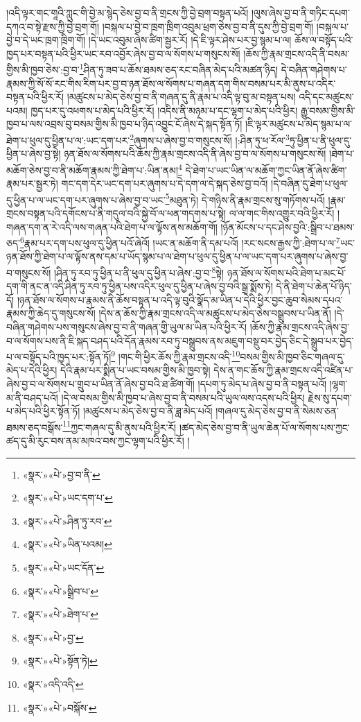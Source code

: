 །འདི་ལྟར་གང་གཱའི་ཀླུང་གི་བྱེ་མ་སྙེད་ཅེས་བྱ་བ་ནི་གྲངས་ཀྱི་བྱེ་བྲག་བསྟན་པའོ། །ལུས་ཞེས་བྱ་བ་ནི་གཏིང་དཔག་དཀའ་བ་སྟེ་རྫས་ཀྱི་བྱེ་བྲག་གོ། །བསྐལ་པ་བྱེ་བ་ཁྲག་ཁྲིག་འབུམ་ཕྲག་ཅེས་བྱ་བ་ནི་དུས་ཀྱི་བྱེ་བྲག་གོ། །བསྐལ་པ་བྱེ་བ་དེ་ཡང་ཁྲག་ཁྲིག་གོ། །དེ་ཡང་འབུམ་ཞེས་ཚིག་སྦྱར་རོ། །དེ་ཇི་ལྟར་ཤེས་པར་བྱ་སྙམ་པ་ལ། ཆོས་ལ་བསྟོད་པའི་ཁྱད་པར་བསྟན་པའི་ཕྱིར་ཡང་རབ་འབྱོར་ཞེས་བྱ་བ་ལ་སོགས་པ་གསུངས་སོ། །ཆོས་ཀྱི་རྣམ་གྲངས་འདི་ནི་བསམ་གྱིས་མི་ཁྱབ་ཅེས་:བྱ་བ་\footnote{«སྣར་»«པེ་»བྱ་བ་ནི་}ཤིན་ཏུ་ཟབ་པ་ཆོས་ཐམས་ཅད་རང་བཞིན་མེད་པའི་མཚན་ཉིད། དེ་བཞིན་གཤེགས་པ་རྣམས་ཀྱི་སོ་སོ་རང་གིས་རིག་པར་བྱ་བ་ཉན་ཐོས་ལ་སོགས་པ་གཞན་དག་གིས་བསམ་པར་མི་ནུས་པ་འདིར་བསྟན་པའི་ཕྱིར་རོ། །མཚུངས་པ་མེད་ཅེས་བྱ་བ་ནི་གཞན་དུ་ནི་རྣམ་པ་འདི་ལྟ་བུ་མ་བསྟན་པས། འདི་དང་མཚུངས་པའམ། ཁྱད་པར་དུ་འཕགས་པ་མེད་པའི་ཕྱིར་རོ། །འདིས་ནི་མཉམ་པ་དང་ལྷག་པ་མེད་པའི་ཕྱིར། རྒྱུ་བསམ་གྱིས་མི་ཁྱབ་པ་ལས་འབྲས་བུ་བསམ་གྱིས་མི་ཁྱབ་པ་ཉིད་འབྱུང་ངོ་ཞེས་དེ་སྐད་སྟོན་ཏོ། །ཇི་ལྟར་མཚུངས་པ་མེད་སྙམ་པ་ལ་ཐེག་པ་ཕུལ་དུ་ཕྱིན་པ་ལ་:ཡང་དག་པར་\footnote{«སྣར་»«པེ་»ཡང་དག་པ་}ཞུགས་པ་ཞེས་བྱ་བ་གསུངས་སོ། །:ཤིན་ཏུ་ཕ་རོལ་\footnote{«སྣར་»«པེ་»ཤིན་ཏུ་རབ་}ཏུ་ཕྱིན་པ་ནི་ཕུལ་དུ་ཕྱིན་པ་ཞེས་བྱ་སྟེ། ཉན་ཐོས་ལ་སོགས་པའི་ཆོས་ཀྱི་རྣམ་གྲངས་འདི་ནི་ཞེས་བྱ་བ་ལ་སོགས་པ་གསུངས་སོ། །ཐེག་པ་མཆོག་ཅེས་བྱ་བ་ནི་མཆོག་རྣམས་ཀྱི་ཐེག་པ་:ཡིན་ནམ།\footnote{«སྣར་»«པེ་»ཡིན་པའམ།} དེ་ཐེག་པ་ཡང་ཡིན་ལ་མཆོག་ཀྱང་ཡིན་ནོ་ཞེས་ཚིག་རྣམ་པར་སྦྱར་ཏེ། གང་དག་དེར་ཡང་དག་པར་ཞུགས་པ་དེ་དག་ལ་དེ་སྐད་ཅེས་བྱ་བའོ། །དེ་བཞིན་དུ་ཐེག་པ་ཕུལ་དུ་ཕྱིན་པ་ལ་ཡང་དག་པར་ཞུགས་པ་ཞེས་བྱ་བ་ཡང་\footnote{«སྣར་»«པེ་»ཡང་དོན་}མཐུན་ཏེ། དེ་གཉིས་ནི་རྣམ་གྲངས་སུ་གཏོགས་པའོ། །རྣམ་གྲངས་བསྟན་པའི་དགོངས་པ་ནི་གདུལ་བའི་སྐྱེ་བོ་ལ་ཕན་གདགས་པ་སྟེ། ལ་ལ་གང་གིས་འགྱུར་བའི་ཕྱིར་རོ། །གཞན་དག་ན་རེ་འདི་ལས་གཞན་པའི་ཐེག་པ་ལ་ལྟོས་ནས་མཆོག་གོ། །ཉོན་མོངས་པ་དང་ཤེས་བྱའི་:སྒྲིབ་པ་ཐམས་ཅད་\footnote{«སྣར་»«པེ་»སྒྲིབ་པ་}རྣམ་པར་དག་པས་ཕུལ་དུ་ཕྱིན་པའོ་ཞེའོ། །ཡང་ན་མཆོག་ནི་དམ་པའོ། །རང་སངས་རྒྱས་ཀྱི་:ཐེག་པ་ལ་\footnote{«སྣར་»«པེ་»ཐེག་པ་}ཡང་ཉན་ཐོས་ཀྱི་ཐེག་པ་ལ་ལྟོས་ནས་དམ་པ་ཡོད་སྙམ་པ་ལ་ཐེག་པ་ཕུལ་དུ་ཕྱིན་པ་ལ་ཡང་དག་པར་ཞུགས་པ་ཞེས་བྱ་བ་གསུངས་སོ། །ཤིན་ཏུ་རབ་ཏུ་ཕྱིན་པ་ནི་ཕུལ་དུ་ཕྱིན་པ་ཞེས་:བྱ་བ་\footnote{«སྣར་»«པེ་»བྱ་}སྟེ། ཉན་ཐོས་ལ་སོགས་པའི་ཐེག་པ་མང་པོ་དག་གི་ནང་ན་འདི་ཤིན་ཏུ་རབ་ཏུ་ཕྱིན་པས་འདིར་ཕུལ་དུ་ཕྱིན་པ་ཞེས་བྱ་བའི་སྒྲ་སྨོས་ཏེ། དེ་ནི་ཐེག་པ་ཆེན་པོ་ཉིད་དོ། །ཉན་ཐོས་ལ་སོགས་པ་རྣམས་ནི་ཆོས་བསྟན་པ་འདི་ལྟ་བུའི་སྣོད་མ་ཡིན་པ་དེའི་ཕྱིར་བྱང་ཆུབ་སེམས་དཔའ་རྣམས་ཀྱི་ཆེད་དུ་གསུངས་སོ། །དེས་ན་ཆོས་ཀྱི་རྣམ་གྲངས་འདི་ལ་མཚུངས་པ་མེད་ཅེས་བསྒྲུབས་པ་ཡིན་ནོ། །དེ་བཞིན་གཤེགས་པས་གསུངས་ཞེས་བྱ་བ་ནི་གཞན་གྱི་ཡུལ་མ་ཡིན་པའི་ཕྱིར་རོ། །ཆོས་ཀྱི་རྣམ་གྲངས་འདི་ཞེས་བྱ་བ་ལ་སོགས་པས་ནི་ཇི་སྐད་བཤད་པའི་དོན་རྣམས་རབ་ཏུ་བསྒྲུབས་ནས་མཇུག་བསྡུ་བར་བྱེད་ཅིང་དེ་སྒྲུབ་པར་བྱེད་པ་ལ་བསྟོད་པའི་ཁྱད་པར་:སྟོན་ཏོ།\footnote{«སྣར་»«པེ་»སྟོན་ཏེ།} །གང་གི་ཕྱིར་ཆོས་ཀྱི་རྣམ་གྲངས་འདི་\footnote{«སྣར་»འདི་འདི་}བསམ་གྱིས་མི་ཁྱབ་ཅིང་གཞལ་དུ་མེད་པ་དེའི་ཕྱིར། དེའི་རྣམ་པར་སྨིན་པ་ཡང་བསམ་གྱིས་མི་ཁྱབ་སྟེ། དེས་ན་གང་ཆོས་ཀྱི་རྣམ་གྲངས་འདི་འཛིན་པ་ཞེས་བྱ་བ་ལ་སོགས་པ་གྲུབ་པ་ཡིན་ནོ་ཞེས་བྱ་བའི་ཐ་ཚིག་གོ། །དཔག་ཏུ་མེད་པ་ཞེས་བྱ་བ་ནི་བསྟན་པའོ། །ལྷག་མ་ནི་བཤད་པའོ། །དེ་ལ་བསམ་གྱིས་མི་ཁྱབ་པ་ཞེས་བྱ་བ་ནི་བསམ་པའི་ཡུལ་ལས་འདས་པའི་ཕྱིར། རྗེས་སུ་དཔག་པ་མེད་པའི་ཕྱིར་སྟོན་ཏོ། །མཚུངས་པ་མེད་ཅེས་བྱ་བ་ནི་ཟླ་མེད་པའོ། །གཞལ་དུ་མེད་ཅེས་བྱ་བ་ནི་སེམས་ཅན་ཐམས་ཅད་བསྒོས་\footnote{«སྣར་»«པེ་»བསྐོས་}ཀྱང་གཞལ་དུ་མི་ནུས་པའི་ཕྱིར་རོ། །ཚད་མེད་ཅེས་བྱ་བ་ནི་ཡུལ་ཆེན་པོ་ལ་སོགས་པས་ཀྱང་ཚད་དུ་མི་རུང་བས་ནམ་མཁའ་བས་ཀྱང་ལྷག་པའི་ཕྱིར་རོ། །

